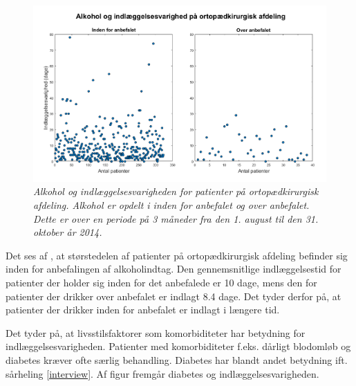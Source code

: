 \begin{figure}[H]
	\centering
	\includegraphics[scale=0.55]{figures/alkohologindlaeg}
	\caption{\textit{Alkohol og indlæggelsesvarigheden for patienter på ortopædkirurgisk afdeling. Alkohol er opdelt i inden for anbefalet og over anbefalet. Dette er over en periode på 3 måneder fra den 1. august til den 31. oktober år 2014. }}
	\label{alkohologindlaeggelse}
\end{figure}


\noindent
Det ses af , at størstedelen af patienter på ortopædkirurgisk afdeling befinder sig inden for anbefalingen af alkoholindtag. Den gennemsnitlige indlæggelsestid for patienter der holder sig inden for det anbefalede er 10 dage, mens den for patienter der drikker over anbefalet er indlagt 8.4 dage. Det tyder derfor på, at patienter der drikker inden for anbefalet er indlagt i længere tid. 

Det tyder på, at livsstilsfaktorer som komorbiditeter har betydning for indlæggelsesvarigheden. Patienter med komorbiditeter f.eks. dårligt blodomløb og diabetes kræver ofte særlig behandling. Diabetes har blandt andet betydning ift. sårheling \ref{interview}. Af figur  fremgår diabetes og indlæggelsesvarigheden. 


